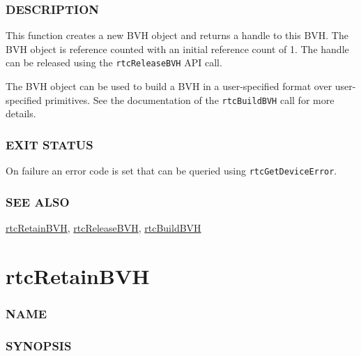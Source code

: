 \subsubsection{DESCRIPTION}\label{description}

This function creates a new BVH object and returns a handle to this BVH.
The BVH object is reference counted with an initial reference count of
1. The handle can be released using the \texttt{rtcReleaseBVH} API call.

The BVH object can be used to build a BVH in a user-specified format
over user-specified primitives. See the documentation of the
\texttt{rtcBuildBVH} call for more details.

\subsubsection{EXIT STATUS}\label{exit-status}

On failure an error code is set that can be queried using
\texttt{rtcGetDeviceError}.

\subsubsection{SEE ALSO}\label{see-also}

\hyperref[rtcretainbvh]{rtcRetainBVH},
\hyperref[rtcreleasebvh]{rtcReleaseBVH},
\hyperref[rtcbuildbvh]{rtcBuildBVH}

\pagebreak

\section{rtcRetainBVH}\label{rtcretainbvh}

\subsubsection{NAME}\label{name}

\begin{Shaded}
\begin{Highlighting}[]
\OperatorTok{{-}}
\end{Highlighting}
\end{Shaded}

\subsubsection{SYNOPSIS}\label{synopsis}

